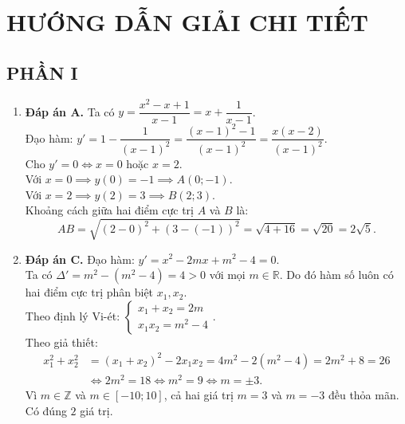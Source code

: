 \documentclass[12pt,a4paper]{article}
\begin{document}
\newpage
\section*{HƯỚNG DẪN GIẢI CHI TIẾT}

\subsection*{PHẦN I}
\begin{enumerate}[label=\textbf{Câu \arabic*:}, leftmargin=*]
\item \textbf{Đáp án A.}
Ta có $y = \dfrac{x^2 - x + 1}{x - 1} = x + \dfrac{1}{x - 1}$.\\
Đạo hàm: $y' = 1 - \dfrac{1}{(x - 1)^2} = \dfrac{(x - 1)^2 - 1}{(x - 1)^2} = \dfrac{x(x - 2)}{(x - 1)^2}$.\\
Cho $y' = 0 \iff x = 0$ hoặc $x = 2$.\\
Với $x = 0 \implies y(0) = -1 \implies A(0; -1)$.\\
Với $x = 2 \implies y(2) = 3 \implies B(2; 3)$.\\
Khoảng cách giữa hai điểm cực trị $A$ và $B$ là:
$$AB = \sqrt{(2 - 0)^2 + (3 - (-1))^2} = \sqrt{4 + 16} = \sqrt{20} = 2\sqrt{5}.$$

\item \textbf{Đáp án C.}
Đạo hàm: $y' = x^2 - 2mx + m^2 - 4 = 0$.\\
Ta có $\Delta' = m^2 - (m^2 - 4) = 4 > 0$ với mọi $m \in \mathbb{R}$. Do đó hàm số luôn có hai điểm cực trị phân biệt $x_1, x_2$.\\
Theo định lý Vi-ét: $\begin{cases} x_1 + x_2 = 2m \\ x_1 x_2 = m^2 - 4 \end{cases}$.\\
Theo giả thiết:
\begin{align*}
x_1^2 + x_2^2 &= (x_1 + x_2)^2 - 2x_1 x_2 = 4m^2 - 2(m^2 - 4) = 2m^2 + 8 = 26 \\
&\iff 2m^2 = 18 \iff m^2 = 9 \iff m = \pm 3.
\end{align*}
Vì $m \in \mathbb{Z}$ và $m \in [-10; 10]$, cả hai giá trị $m = 3$ và $m = -3$ đều thỏa mãn. Có đúng $2$ giá trị.


\end{enumerate}
\end{document}
